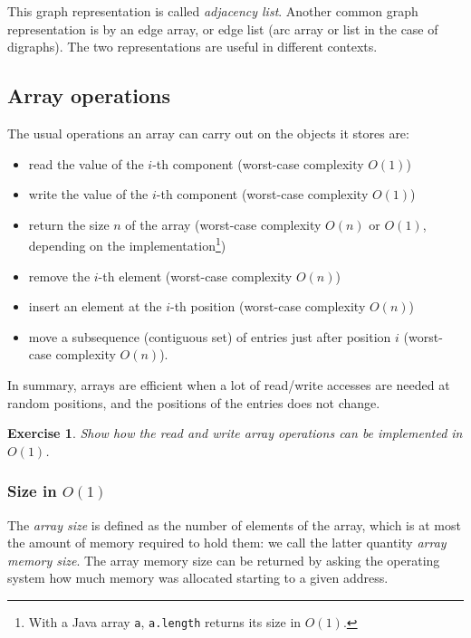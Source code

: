 \documentclass[a4paper]{book}
\theoremstyle{changebreak}                %
\newtheorem{ex}[result]{Exercise}
\begin{document}
This graph representation is called {\it adjacency
  list}. Another
common graph representation is by an edge
array, or edge list (arc array
or list in the case of
digraphs). The two representations are useful in
different contexts.

\subsection{Array operations}
\label{s:array:operations}
The usual operations an array can carry out on
the objects it stores are:
\begin{itemize}
\item read the value of the $i$-th
  component (worst-case complexity $O(1)$)
\item write the value of the
  $i$-th component (worst-case complexity
  $O(1)$)
\item return the size $n$ of the
  array (worst-case complexity $O(n)$ or $O(1)$, depending on the
  implementation\footnote{With a Java array {\tt a}, {\tt a.length}
    returns its size in $O(1)$.})
\item remove the $i$-th
  element (worst-case complexity $O(n)$)
\item insert an element at the
  $i$-th position (worst-case complexity $O(n)$)
\item move a subsequence
  (contiguous set) of entries just after position $i$ (worst-case
  complexity $O(n)$).
\end{itemize}
In summary, arrays are efficient when a lot of
read/write accesses are needed at random
positions, and the positions of the entries does not change.

\begin{ex}
Show how the read and write array operations can be implemented in
$O(1)$.
\end{ex}

\subsubsection{Size in $O(1)$}
The {\it array size} is defined as the number of
elements of the array, which is at most the amount of memory required
to hold them: we call the latter quantity {\it array memory
  size}. The array memory size can be
returned by asking the operating system how
much memory was allocated starting to a given address.
\end{document}
